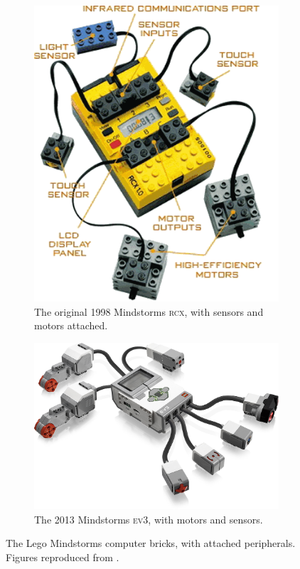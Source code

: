 \documentclass[]{article}
\newcommand{\ev}{\textsc{ev3}}
\begin{document}
\begin{figure}[hb!]
    \centering
    \begin{subfigure}[htbp]{0.4\textwidth}
        \includegraphics[width=\textwidth]{fig/RCX-connections.png}
        \caption{The original 1998 Mindstorms \textsc{rcx}, with sensors and motors attached.}
        \label{fig:rcx}
    \end{subfigure}
    \qquad
    \begin{subfigure}[htbp]{0.4\textwidth}
        \includegraphics[width=\textwidth]{fig/ev3_connections.jpg}
        \caption{The 2013 Mindstorms \ev{}, with motors and sensors.}
        \label{fig:ev3}
    \end{subfigure}
    \caption{The Lego Mindstorms computer bricks, with attached peripherals. Figures reproduced from \cite{_legomindstormsrobots.com_2015}.}
    \label{fig:mindstorms_bricks}
\end{figure}
\end{document}
